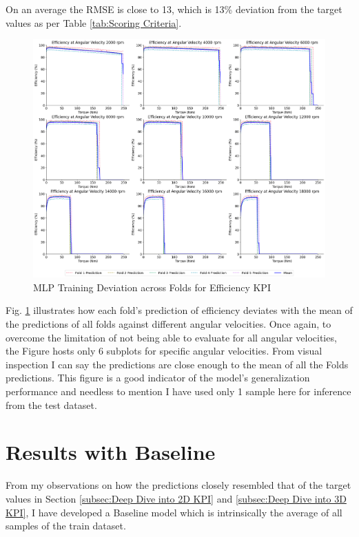\documentclass{report} %
\begin{document}
On an average the \ac{RMSE} is close to 13, which is 13\% deviation from the target values as per Table \ref{tab:Scoring Criteria}.

\begin{figure}[H]
    \centering
    \includegraphics[width=1\textwidth]{./ReportImages/folds_dev_y2.png} 
    \caption{MLP Training Deviation across Folds for Efficiency \ac{KPI}} 
    \label{fig:MLP Training Deviation across Folds for Efficiency KPI}
\end{figure}

Fig. \ref{fig:MLP Training Deviation across Folds for Efficiency KPI} illustrates how each fold's prediction of efficiency deviates with the mean of the predictions 
of all folds against different angular velocities. Once again, to overcome the limitation of not being able to evaluate for all angular velocities, the Figure hosts only 6 
subplots for specific angular velocities. From visual inspection I can say the predictions are close enough to the mean of all the Folds predictions.
This figure is a good indicator of the model's generalization performance and needless to mention I have used only 1 sample here for inference from the test dataset.

\section{Results with Baseline}\label{sec:Results with Baseline}

From my observations on how the predictions closely resembled that of the target values in Section \ref{subsec:Deep Dive into 2D KPI} and 
\ref{subsec:Deep Dive into 3D KPI}, I have developed a Baseline model which is intrinsically the average of all samples of the train dataset.
\end{document}
